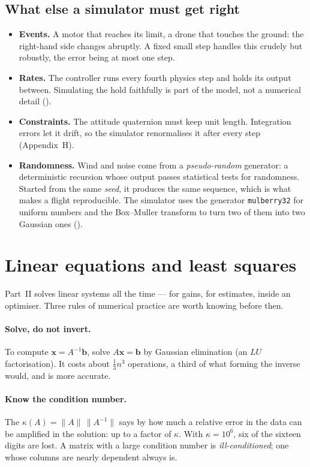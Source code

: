 \subsection{What else a simulator must get right}
\begin{itemize}
  \item \textbf{Events.} A motor that reaches its limit, a drone that touches the ground: the right-hand side changes abruptly. A fixed small step handles this crudely but robustly, the error being at most one step.
  \item \textbf{Rates.} The controller runs every fourth physics step and holds its output between. Simulating the hold faithfully is part of the model, not a numerical detail ().
  \item \textbf{Constraints.} The attitude quaternion must keep unit length. Integration errors let it drift, so the simulator renormalises it after every step (Appendix~H).
  \item \textbf{Randomness.} Wind and noise come from a \emph{pseudo-random} generator: a deterministic recursion whose output passes statistical tests for randomness. Started from the same \emph{seed}, it produces the same sequence, which is what makes a flight reproducible. The simulator uses the generator \texttt{mulberry32} for uniform numbers and the Box–Muller transform to turn two of them into two Gaussian ones ().
\end{itemize}

\section{Linear equations and least squares}

Part~II solves linear systems all the time — for gains, for estimates, inside an optimiser. Three rules of numerical practice are worth knowing before then.

\paragraph{Solve, do not invert.} To compute $\symbf x = A^{-1}\symbf b$, solve $A\symbf x = \symbf b$ by Gaussian elimination (an $LU$ factorisation). It costs about $\tfrac13n^3$ operations, a third of what forming the inverse would, and is more accurate.

\paragraph{Know the condition number.} The  $\kappa(A) = \|A\|\,\|A^{-1}\|$ says by how much a relative error in the data can be amplified in the solution: up to a factor of $\kappa$. With $\kappa = 10^6$, six of the sixteen digits are lost. A matrix with a large condition number is \emph{ill-conditioned}; one whose columns are nearly dependent always is.


